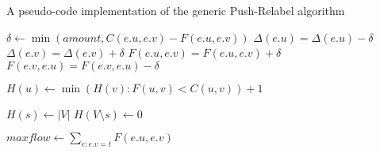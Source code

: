 \documentclass[10pt,a4paper,hidelinks]{article}
\begin{document}
\begin{algorithm}
\caption{A pseudo-code implementation of the generic Push-Relabel algorithm}
\label{algo:push-relabel}

\begin{algorithmic}
	\State $\delta \gets \min(amount, C(e.u, e.v) - F(e.u, e.v))$
	\State $\Delta(e.u) = \Delta(e.u) - \delta$
	\State $\Delta(e.v) = \Delta(e.v) + \delta$
	\State $F(e.u, e.v) = F(e.u, e.v) + \delta$
	\State $F(e.v, e.u) = F(e.v, e.u) - \delta$
\EndFunction

\State

	\State $H(u) \gets \min(H(v) : F(u, v) < C(u, v)) + 1$
\EndFunction

\State

	\State {}
\EndFor

\State

\State $H(s) \gets |V|$
\State $H(V \setminus s) \gets 0$

\State

		\State {}
	\Else
		\State {}
	\EndIf
\EndWhile

\State

\State $maxflow \gets \sum\limits_{e : e.v = t} F(e.u, e.v)$
\end{algorithmic}
\end{algorithm}



\end{document}
